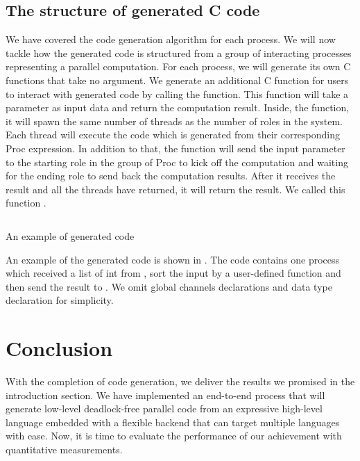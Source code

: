 \subsection{The structure of generated C code} \label{codegen:sec:structure}
We have covered the code generation algorithm for each process. We will now tackle how the generated code is structured from a group of interacting processes representing a parallel computation. For each process, we will generate its own C functions that take no argument. We generate an additional C function for users to interact with generated code by calling the function. This function will take a parameter as input data and return the computation result. Inside, the function, it will spawn the same number of threads as the number of roles in the system. Each thread will execute the code which is generated from their corresponding Proc expression. In addition to that, the function will send the input parameter to the starting role in the group of Proc to kick off the computation and waiting for the ending role to send back the computation results. After it receives the result and all the threads have returned, it will return the result. We called this function .
\begin{listing}
    \inputminted{C}{codegen/total.c} 
    \caption{An example of generated code}
    \label{codegen:code:total}
\end{listing}

An example of the generated code is shown in . The code contains one process which received a list of int from , sort the input by a user-defined function and then send the result to . We omit global channels declarations and data type declaration for simplicity. 

\section{Conclusion}
With the completion of code generation, we deliver the results we promised in the introduction section. We have implemented an end-to-end process that will generate low-level deadlock-free parallel code from an expressive high-level language embedded with a flexible backend that can target multiple languages with ease. Now, it is time to evaluate the performance of our achievement with quantitative measurements.